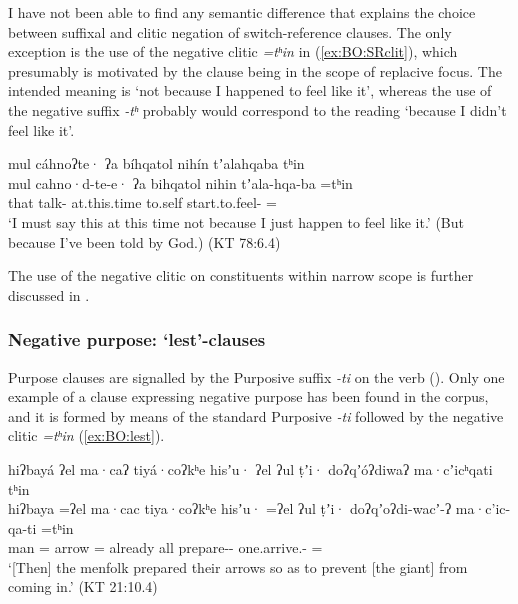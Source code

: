 \documentclass[output=paper,modfonts,nonflat,colorlinks,citecolor=brown]{langscibook}
\begin{document}
I have not been able to find any semantic difference that explains the choice between suffixal and clitic negation of switch-reference clauses. The only exception is the use of the negative clitic \textit{=tʰin} in (\ref{ex:BO:SRclit}), which presumably is motivated by the clause being in the scope of replacive focus. The intended meaning is `not because I happened to feel like it', whereas the use of the negative suffix \textit{-tʰ} probably would correspond to the reading `because I didn't feel like it'.

\ea 
\label{ex:BO:SRclit}
\glll mul cáhnoʔte· ʔa bíhqatol nihín tʼalahqaba tʰin \\
    mul cahno·d-te-e· ʔa bihqatol nihin tʼala-hqa-ba =tʰin \\
    that talk-  at.this.time to.self start.to.feel- = \\
\glt `I must say this at this time not because I just happen to feel like it.' (But because I've been told by God.) ({KT 78:6.4})\\
\z

\noindent The use of the negative clitic on constituents within narrow scope is further discussed in .

\subsubsection{Negative purpose: `lest'-clauses}
\label{sec:BO:NegPurp}
Purpose clauses are signalled by the Purposive suffix \textit{-ti} on the verb (\citealt[39]{Olsson2010}). Only one example of a clause expressing negative purpose has been found in the corpus, and it is formed by means of the standard Purposive \textit{-ti} followed by the negative clitic \textit{=tʰin} (\ref{ex:BO:lest}).

\ea 
\label{ex:BO:lest}
\glll [\ldots] hiʔbayá ʔel ma·caʔ tiyá·coʔkʰe hisʼu· ʔel ʔul ṭʼi· doʔqʼóʔdiwaʔ ma·cʼicʰqati tʰin \\
    {} hiʔbaya =ʔel ma·cac tiya·coʔkʰe hisʼu· =ʔel ʔul ṭʼi· doʔqʼoʔdi-wacʼ-ʔ ma·c'ic-qa-ti =tʰin \\
    {} man =   arrow = already all prepare-- one.arrive.- = \\
\glt `[Then] the menfolk prepared their arrows so as to prevent [the giant] from coming in.' ({KT 21:10.4})\\
\z
\end{document}

